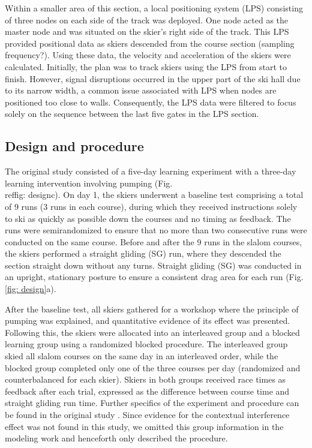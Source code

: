 \documentclass{article}
\begin{document}
Within a smaller area of this section, a local positioning system (LPS) consisting of three nodes on each side of the track was deployed. One node acted as the master node and was situated on the skier's right side of the track. This LPS provided positional data as skiers descended from the course section (sampling frequency?). Using these data, the velocity and acceleration of the skiers were calculated. Initially, the plan was to track skiers using the LPS from start to finish. However, signal disruptions occurred in the upper part of the ski hall due to its narrow width, a common issue associated with LPS when nodes are positioned too close to walls. Consequently, the LPS data were filtered to focus solely on the sequence between the last five gates in the LPS section.

\subsection{Design and procedure}
The original study consisted of a five-day learning experiment with a three-day learning intervention involving pumping (Fig. \\ref{fig: design}c). On day 1, the skiers underwent a baseline test comprising a total of 9 runs (3 runs in each course), during which they received instructions solely to ski as quickly as possible down the courses and no timing as feedback. The runs were semirandomized to ensure that no more than two consecutive runs were conducted on the same course. Before and after the 9 runs in the slalom courses, the skiers performed a straight gliding (SG) run, where they descended the section straight down without any turns. Straight gliding (SG) was conducted in an upright, stationary posture to ensure a consistent drag area for each run (Fig.\ref{fig: design}a).

After the baseline test, all skiers gathered for a workshop where the principle of pumping was explained, and quantitative evidence of its effect was presented. Following this, the skiers were allocated into an interleaved group and a blocked learning group using a randomized blocked procedure. The interleaved group skied all slalom courses on the same day in an interleaved order, while the blocked group completed only one of the three courses per day (randomized and counterbalanced for each skier). Skiers in both groups received race times as feedback after each trial, expressed as the difference between course time and straight gliding run time. Further specifics of the experiment and procedure can be found in the original study \cite{magelssen_is_2022}. Since evidence for the contextual interference effect was not found in this study, we omitted this group information in the modeling work and henceforth only described the procedure.
\end{document}
